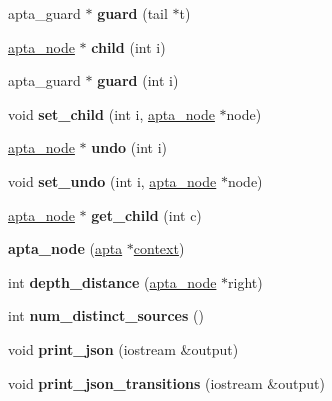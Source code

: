 \begin{DoxyCompactItemize}
apta\+\_\+guard $\ast$ {\bfseries guard} (tail $\ast$t)
\item 
\mbox{\label{classapta__node_a39a38233da37cadf39634e2f205e333d}} 
\hyperlink{classapta__node}{apta\+\_\+node} $\ast$ {\bfseries child} (int i)
\item 
\mbox{\label{classapta__node_aa2c77eb0aefe1062ec37c5f89fbb0b2f}} 
apta\+\_\+guard $\ast$ {\bfseries guard} (int i)
\item 
\mbox{\label{classapta__node_a6ccb30e9120c838e7af8e2c007ff0046}} 
void {\bfseries set\+\_\+child} (int i, \hyperlink{classapta__node}{apta\+\_\+node} $\ast$node)
\item 
\mbox{\label{classapta__node_af8a4f8ae7e447dddbd4ba74870921c21}} 
\hyperlink{classapta__node}{apta\+\_\+node} $\ast$ {\bfseries undo} (int i)
\item 
\mbox{\label{classapta__node_a86f8a70dea375ffbc9ac5cd5782acd3c}} 
void {\bfseries set\+\_\+undo} (int i, \hyperlink{classapta__node}{apta\+\_\+node} $\ast$node)
\item 
\mbox{\label{classapta__node_a54b92652f30841a25e39c8bbaeabbdc1}} 
\hyperlink{classapta__node}{apta\+\_\+node} $\ast$ {\bfseries get\+\_\+child} (int c)
\item 
\mbox{\label{classapta__node_ae27f86d054b6bfb50a908509969c1b09}} 
{\bfseries apta\+\_\+node} (\hyperlink{classapta}{apta} $\ast$\hyperlink{classapta__node_ae216b528459a269d45957a919a6180e8}{context})
\item 
\mbox{\label{classapta__node_ac881835f2fc1f79a09f06bce53f01756}} 
int {\bfseries depth\+\_\+distance} (\hyperlink{classapta__node}{apta\+\_\+node} $\ast$right)
\item 
\mbox{\label{classapta__node_a7d65cfa014535da39bfe3de785769639}} 
int {\bfseries num\+\_\+distinct\+\_\+sources} ()
\item 
\mbox{\label{classapta__node_abc9afeb2a32d6a0702f6ddd6f50c79ff}} 
void {\bfseries print\+\_\+json} (iostream \&output)
\item 
\mbox{\label{classapta__node_af399c3fb9b4f3ba762301aa1d7a43627}} 
void {\bfseries print\+\_\+json\+\_\+transitions} (iostream \&output)
\end{DoxyCompactItemize}
